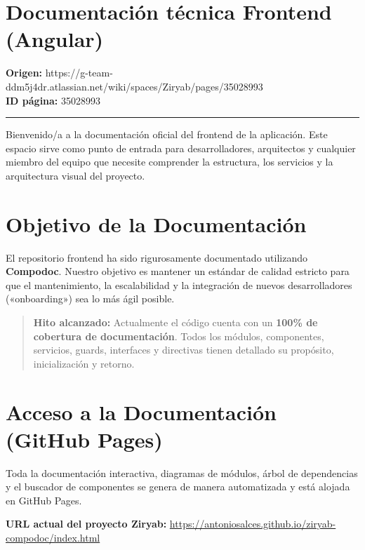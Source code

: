\documentclass[
  spanish,
  11pt,
]{report}
\begin{document}
\section{Documentación técnica Frontend
(Angular)}\label{documentaciuxf3n-tuxe9cnica-frontend-angular}

\textbf{Origen:}
https://g-team-ddm5j4dr.atlassian.net/wiki/spaces/Ziryab/pages/35028993\\
\textbf{ID página:} 35028993

\begin{center}\rule{0.5\linewidth}{0.5pt}\end{center}

Bienvenido/a a la documentación oficial del frontend de la aplicación.
Este espacio sirve como punto de entrada para desarrolladores,
arquitectos y cualquier miembro del equipo que necesite comprender la
estructura, los servicios y la arquitectura visual del proyecto.

\section{Objetivo de la
Documentación}\label{objetivo-de-la-documentaciuxf3n}

El repositorio frontend ha sido rigurosamente documentado utilizando
\textbf{Compodoc}. Nuestro objetivo es mantener un estándar de calidad
estricto para que el mantenimiento, la escalabilidad y la integración de
nuevos desarrolladores («onboarding») sea lo más ágil posible.

\begin{quote}
\textbf{Hito alcanzado:} Actualmente el código cuenta con un
\textbf{100\% de cobertura de documentación}. Todos los módulos,
componentes, servicios, guards, interfaces y directivas tienen detallado
su propósito, inicialización y retorno.
\end{quote}

\section{Acceso a la Documentación (GitHub
Pages)}\label{acceso-a-la-documentaciuxf3n-github-pages}

Toda la documentación interactiva, diagramas de módulos, árbol de
dependencias y el buscador de componentes se genera de manera
automatizada y está alojada en GitHub Pages.

\textbf{URL actual del proyecto Ziryab:}
\url{https://antoniosalces.github.io/ziryab-compodoc/index.html}
\end{document}
